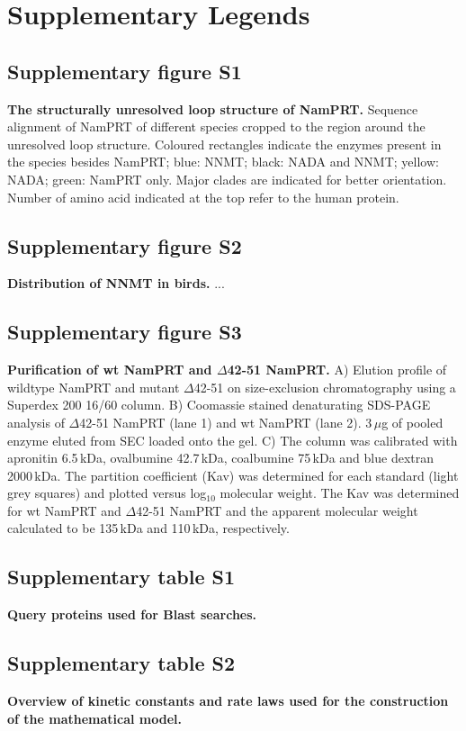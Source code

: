 
\section*{Supplementary Legends}

\subsection*{Supplementary figure S1}

\textbf{The structurally unresolved loop structure of NamPRT.} Sequence alignment of NamPRT of different species cropped to the region around the unresolved loop structure. Coloured rectangles indicate the enzymes present in the species besides NamPRT; blue: NNMT; black: NADA and NNMT; yellow: NADA; green: NamPRT only. Major clades are indicated for better orientation. Number of amino acid indicated at the top refer to the human protein.


\subsection*{Supplementary figure S2}

\textbf{Distribution of NNMT in birds.} ... 


\subsection*{Supplementary figure S3}

\textbf{Purification of wt NamPRT and $\Delta$42-51 NamPRT.} A) Elution profile of wildtype NamPRT and mutant $\Delta$42-51 on size-exclusion chromatography using a Superdex 200 16/60 column. B) Coomassie stained denaturating SDS-PAGE analysis of $\Delta$42-51 NamPRT (lane 1) and wt NamPRT (lane 2). 3\,$\mu$g of pooled enzyme eluted from SEC loaded onto the gel. C) The column was calibrated with apronitin 6.5\,kDa, ovalbumine 42.7\,kDa, coalbumine 75\,kDa and blue dextran 2000\,kDa. The partition coefficient (Kav) was determined for each standard (light grey squares) and plotted versus log$_{10}$ molecular weight. The Kav was determined for wt NamPRT and $\Delta$42-51 NamPRT and the apparent molecular weight calculated to be 135\,kDa and 110\,kDa, respectively.


\subsection*{Supplementary table S1}

\textbf{Query proteins used for Blast searches.}


\subsection*{Supplementary table S2}

\textbf{Overview of kinetic constants and rate laws used for the construction of the mathematical model.}
